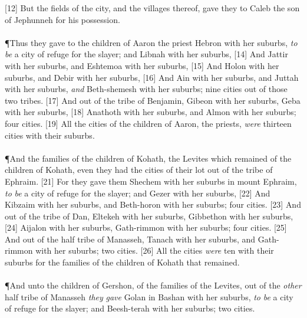 [12] \textcolor[cmyk]{0.99998,1,0,0}{But the fields of the city, and the villages thereof, gave they to Caleb the son of Jephunneh for his possession.}\\
\\
\P \textcolor[cmyk]{0.99998,1,0,0}{Thus they gave to the children of Aaron the priest Hebron with her suburbs, \emph{to} \emph{be} a city of refuge for the slayer; and Libnah with her suburbs,}
[14] \textcolor[cmyk]{0.99998,1,0,0}{And Jattir with her suburbs, and Eshtemoa with her suburbs,}
[15] \textcolor[cmyk]{0.99998,1,0,0}{And Holon with her suburbs, and Debir with her suburbs,}
[16] \textcolor[cmyk]{0.99998,1,0,0}{And Ain with her suburbs, and Juttah with her suburbs, \emph{and} Beth-shemesh with her suburbs; nine cities out of those two tribes.}
[17] \textcolor[cmyk]{0.99998,1,0,0}{And out of the tribe of Benjamin, Gibeon with her suburbs, Geba with her suburbs,}
[18] \textcolor[cmyk]{0.99998,1,0,0}{Anathoth with her suburbs, and Almon with her suburbs; four cities.}
[19] \textcolor[cmyk]{0.99998,1,0,0}{All the cities of the children of Aaron, the priests, \emph{were} thirteen cities with their suburbs.}\\
\\
\P \textcolor[cmyk]{0.99998,1,0,0}{And the families of the children of Kohath, the Levites which remained of the children of Kohath, even they had the cities of their lot out of the tribe of Ephraim.}
[21] \textcolor[cmyk]{0.99998,1,0,0}{For they gave them Shechem with her suburbs in mount Ephraim, \emph{to} \emph{be} a city of refuge for the slayer; and Gezer with her suburbs,}
[22] \textcolor[cmyk]{0.99998,1,0,0}{And Kibzaim with her suburbs, and Beth-horon with her suburbs; four cities.}
[23] \textcolor[cmyk]{0.99998,1,0,0}{And out of the tribe of Dan, Eltekeh with her suburbs, Gibbethon with her suburbs,}
[24] \textcolor[cmyk]{0.99998,1,0,0}{Aijalon with her suburbs, Gath-rimmon with her suburbs; four cities.}
[25] \textcolor[cmyk]{0.99998,1,0,0}{And out of the half tribe of Manasseh, Tanach with her suburbs, and Gath-rimmon with her suburbs; two cities.}
[26] \textcolor[cmyk]{0.99998,1,0,0}{All the cities \emph{were} ten with their suburbs for the families of the children of Kohath that remained.}\\
\\
\P \textcolor[cmyk]{0.99998,1,0,0}{And unto the children of Gershon, of the families of the Levites, out of the \emph{other} half tribe of Manasseh \emph{they} \emph{gave} Golan in Bashan with her suburbs, \emph{to} \emph{be} a city of refuge for the slayer; and Beesh-terah with her suburbs; two cities.}
